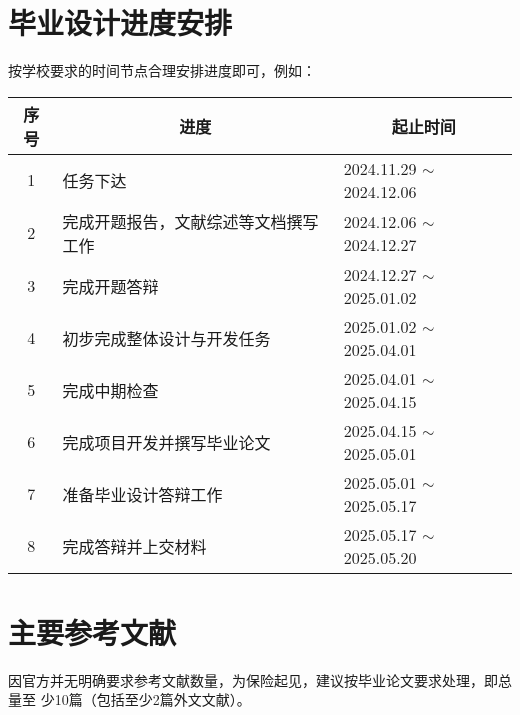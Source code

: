 \section{毕业设计进度安排}

\begin{tcolorbox}
	按学校要求的时间节点合理安排进度即可，例如：
\end{tcolorbox}

\begin{table}[!htbp]
	\centering
	\vspace{-2ex}
	\small%
	\begin{tabular}{cp{25em}p{10.5em}}
		\toprule
		\textbf{序号} & \multicolumn{1}{c}{\textbf{进度}} & \multicolumn{1}{c}{\textbf{起止时间}} \\
		\midrule
		1           & 任务下达                            & 2024.11.29 $\sim$ 2024.12.06      \\
		2           & 完成开题报告，文献综述等文档撰写工作              & 2024.12.06 $\sim$ 2024.12.27      \\
		3           & 完成开题答辩                          & 2024.12.27 $\sim$ 2025.01.02      \\
		4           & 初步完成整体设计与开发任务                   & 2025.01.02 $\sim$ 2025.04.01      \\
		5           & 完成中期检查                          & 2025.04.01 $\sim$ 2025.04.15      \\
		6           & 完成项目开发并撰写毕业论文                   & 2025.04.15 $\sim$ 2025.05.01      \\
		7           & 准备毕业设计答辩工作                      & 2025.05.01 $\sim$ 2025.05.17      \\
		8           & 完成答辩并上交材料                       & 2025.05.17 $\sim$ 2025.05.20      \\
		\bottomrule
	\end{tabular}
	\vspace{-2ex}
\end{table}

\section{主要参考文献}

\begin{tcolorbox}
	因官方并无明确要求参考文献数量，为保险起见，建议按毕业论文要求处理，即总量至
	少10篇（包括至少2篇外文文献）。
\end{tcolorbox}

